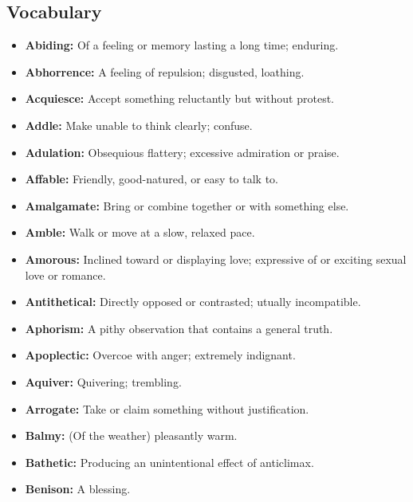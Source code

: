 \documentclass[crop=false,class=book]{standalone}
\begin{document}
        \subsection{Vocabulary}
            \begin{itemize}[noitemsep]
                \item \textbf{Abiding:} Of a feeling or memory lasting
                      a long time; enduring.
                \item \textbf{Abhorrence:} A feeling of repulsion;
                      disgusted, loathing.
                \item \textbf{Acquiesce:} Accept something reluctantly
                      but without protest.
                \item \textbf{Addle:} Make unable to think clearly; confuse.
                \item \textbf{Adulation:} Obsequious flattery;
                      excessive admiration or praise.
                \item \textbf{Affable:} Friendly, good-natured, or easy
                      to talk to.
                \item \textbf{Amalgamate:} Bring or combine together or
                      with something else.
                \item \textbf{Amble:} Walk or move at a slow, relaxed pace.
                \item \textbf{Amorous:} Inclined toward or displaying
                      love; expressive of or exciting sexual love or romance.
                \item \textbf{Antithetical:} Directly opposed or
                      contrasted; utually incompatible.
                \item \textbf{Aphorism:} A pithy observation that contains
                      a general truth.
                \item \textbf{Apoplectic:} Overcoe with anger;
                      extremely indignant.
                \item \textbf{Aquiver:} Quivering; trembling.
                \item \textbf{Arrogate:} Take or claim something
                      without justification.
                \item \textbf{Balmy:} (Of the weather) pleasantly warm.
                \item \textbf{Bathetic:} Producing an unintentional
                      effect of anticlimax.
                \item \textbf{Benison:} A blessing.

\end{itemize}
\end{document}
